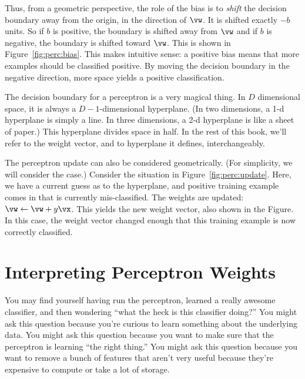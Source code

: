 Thus, from a geometric perspective, the role of the bias is to
\emph{shift} the decision boundary away from the origin, in the
direction of $\vw$.  It is shifted exactly $-b$ units.  So if $b$ is
positive, the boundary is shifted away from $\vw$ and if $b$ is
negative, the boundary is shifted toward $\vw$.  This is shown in
Figure~\ref{fig:perc:bias}.  This makes intuitive sense: a positive
bias means that more examples should be classified positive.  By
moving the decision boundary in the negative direction, more space
yields a positive classification.


The decision boundary for a perceptron is a very magical thing.  In
$D$ dimensional space, it is always a $D-1$-dimensional hyperplane.
(In two dimensions, a 1-d hyperplane is simply a line.  In three
dimensions, a 2-d hyperplane is like a sheet of paper.)  This
hyperplane divides space in half.  In the rest of this book, we'll
refer to the weight vector, and to hyperplane it defines,
interchangeably.


The perceptron update can also be considered geometrically.  (For
simplicity, we will consider the  case.)  Consider
the situation in Figure~\ref{fig:perc:update}.  Here, we have a current
guess as to the hyperplane, and positive training example comes in
that is currently mis-classified.  The weights are updated: $\vw
\leftarrow \vw + y \vx$.  This yields the new weight vector, also
shown in the Figure.  In this case, the weight vector changed enough
that this training example is now correctly classified.

\section{Interpreting Perceptron Weights}

You may find yourself having run the perceptron, learned a really awesome classifier, and then wondering ``what the heck is this classifier doing?''
You might ask this question because you're curious to learn something about the underlying data.
You might ask this question because you want to make sure that the perceptron is learning ``the right thing.''
You might ask this question because you want to remove a bunch of features that aren't very useful because they're expensive to compute or take a lot of storage.

